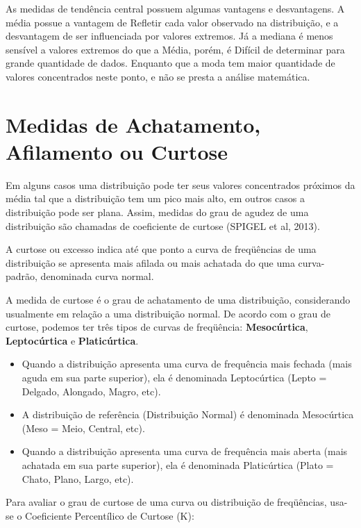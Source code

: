 As medidas de tendência  central possuem algumas vantagens e desvantagens. A média possue a vantagem de Refletir cada valor observado na distribuição, e a desvantagem de ser influenciada por valores extremos. Já a mediana é menos sensível a valores extremos do que a Média, porém, é Difícil de determinar para grande quantidade de dados. Enquanto que a moda tem maior quantidade de valores concentrados neste ponto, e não se presta a análise matemática.
 
\newpage 

\section{Medidas de Achatamento, Afilamento ou Curtose }

\inic Em alguns casos uma distribuição pode ter seus valores concentrados próximos da média tal que a distribuição tem um pico mais alto, em outros casos a distribuição pode ser plana. Assim, medidas do grau de agudez de uma distribuição são chamadas de coeficiente de curtose (SPIGEL et al, 2013). \vskip0.3cm

\inic A curtose ou excesso indica até que ponto a curva de freqüências de uma distribuição se apresenta mais afilada ou mais achatada do que uma curva-padrão, denominada curva normal.\vskip0.3cm

\inic A medida de curtose é o grau de achatamento de uma distribuição, considerando usualmente em relação a uma distribuição normal. De acordo com o grau de curtose, podemos ter três tipos de curvas de freqüência: \textbf{Mesocúrtica}, \textbf{Leptocúrtica} e \textbf{Platicúrtica}.\vskip0.3cm

\begin{itemize}
\item Quando a distribuição apresenta uma curva de frequência mais fechada (mais aguda em sua parte superior), ela é denominada Leptocúrtica (Lepto = Delgado, Alongado, Magro, etc).
\item A distribuição de referência (Distribuição Normal) é denominada Mesocúrtica (Meso = Meio, Central, etc).
\item Quando a distribuição apresenta uma curva de frequência mais aberta (mais achatada em sua parte superior), ela é denominada Platicúrtica (Plato = Chato, Plano, Largo, etc).
\end{itemize}

Para avaliar o grau de curtose de uma curva ou distribuição de freqüências, usa-se o Coeficiente Percentílico de Curtose (K):

